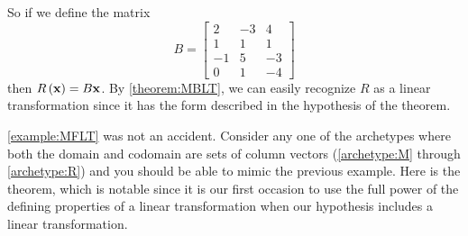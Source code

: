 \documentclass{ximera}
\begin{document}
\begin{example}
So if we define the matrix
\[
B=
\begin{bmatrix}
2&-3&4\\
1&1&1\\
-1&5&-3\\
0&1&-4
\end{bmatrix}
\]
then $R\left(\mathbf{x}\right)=B\mathbf{x}$.  By \ref{theorem:MBLT}, we can easily recognize $R$ as a linear transformation since it has the form described in the hypothesis of the theorem.



\end{example}

\ref{example:MFLT} was not an accident.  Consider any one of the archetypes where both the domain and codomain are sets of column vectors (\ref{archetype:M} through \ref{archetype:R}) and you should be able to mimic the previous example.  Here is the theorem, which is notable since it is our first occasion to use the full power of the defining properties of a linear transformation when our hypothesis includes a linear transformation.
\end{document}
